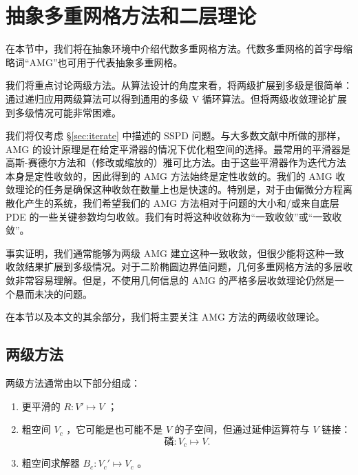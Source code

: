\documentclass[12pt]{acta_2011xz}
\begin{document}
   \section{抽象多重网格方法和二层理论  }       \label{s:2Level}    在本节中，我们将在抽象环境中介绍代数多重网格方法。代数多重网格的首字母缩略词“AMG”也可用于代表抽象多重网格。  

我们将重点讨论两级方法。从算法设计的角度来看，将两级扩展到多级是很简单：通过递归应用两级算法可以得到通用的多级 V 循环算法。但将两级收敛理论扩展到多级情况可能非常困难。  

我们将仅考虑    \S       \ref{sec:iterate}    中描述的 SSPD 问题。与大多数文献中所做的那样，AMG 的设计原理是在给定平滑器的情况下优化粗空间的选择。最常用的平滑器是高斯-赛德尔方法和（修改或缩放的）雅可比方法。由于这些平滑器作为迭代方法本身是定性收敛的，因此得到的 AMG 方法始终是定性收敛的。我们的 AMG 收敛理论的任务是确保这种收敛在数量上也是快速的。特别是，对于由偏微分方程离散化产生的系统，我们希望我们的 AMG 方法相对于问题的大小和/或来自底层 PDE 的一些关键参数均匀收敛。我们有时将这种收敛称为“一致收敛”或“一致收敛”。  

事实证明，我们通常能够为两级 AMG 建立这种一致收敛，但很少能将这种一致收敛结果扩展到多级情况。对于二阶椭圆边界值问题，几何多重网格方法的多层收敛非常容易理解。但是，不使用几何信息的 AMG 的严格多层收敛理论仍然是一个悬而未决的问题。  

在本节以及本文的其余部分，我们将主要关注 AMG 方法的两级收敛理论。  

   \subsection{两级方法  }     


   


 
 
 
 
 
 
   

   \newcommand{\pr}     { 磷   }   

两级方法通常由以下部分组成：
   \begin{enumerate}[1.]

   \item   更平滑的    $R: V'\mapsto V$   ；   \item   粗空间    $V_c$    ，它可能是也可能不是
   $V$    的子空间，但通过延伸运算符与    $V$    链接：
   $$
\pr:  V_c\mapsto V. 
$$      \item   粗空间求解器    $B_c: V_c'\mapsto V_c$    。  \end{enumerate}     
\end{document}
